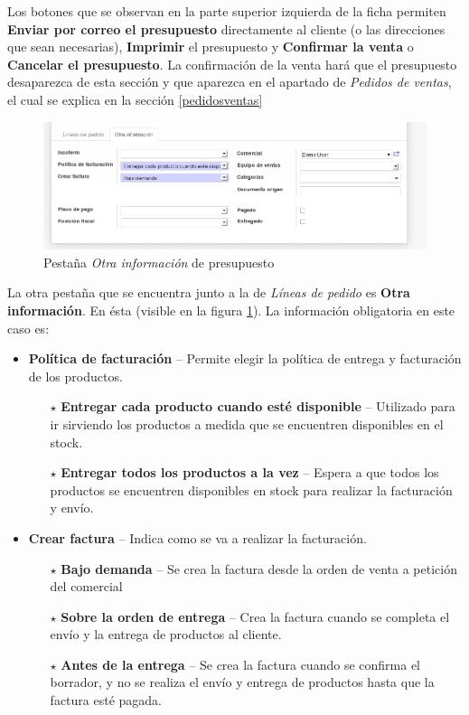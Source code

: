 Los botones que se observan en la parte superior izquierda de la ficha permiten \textbf{Enviar por correo el presupuesto} directamente al
cliente (o las direcciones que sean necesarias), \textbf{Imprimir} el presupuesto y \textbf{Confirmar la venta} o \textbf{Cancelar el presupuesto}. La confirmación de la venta hará que el presupuesto desaparezca de esta sección y que aparezca en el apartado de \emph{Pedidos de ventas}, el cual se explica en la sección \ref{pedidosventas}

\begin{figure}[H]
\includegraphics[width=\textwidth]{ventas/img/ven_preindotra.png}
\caption{Pestaña \emph{Otra información} de presupuesto}
\label{ven:preindotra}
\end{figure}

La otra pestaña que se encuentra junto a la de \emph{Líneas de pedido} es \textbf{Otra información}. En ésta (visible en la figura 
\ref{ven:preindotra}). La información obligatoria en este caso es:

\begin{itemize}
  \item \textbf{Política de facturación} -- Permite elegir la política de entrega y facturación de los productos.
  \begin{itemize}
    \item[$\star$] \textbf{Entregar cada producto cuando esté disponible} -- Utilizado para ir sirviendo los productos a medida que se encuentren 
          disponibles en el stock.
    \item[$\star$] \textbf{Entregar todos los productos a la vez} -- Espera a que todos los productos se encuentren disponibles en stock para realizar la
          facturación y envío.
  \end{itemize}

  \item \textbf{Crear factura} -- Indica como se va a realizar la facturación.
    \begin{itemize}
      \item[$\star$] \textbf{Bajo demanda} -- Se crea la factura desde la orden de venta a petición del comercial
      \item[$\star$] \textbf{Sobre la orden de entrega} -- Crea la factura cuando se completa el envío y la entrega de productos al cliente.
      \item[$\star$] \textbf{Antes de la entrega} -- Se crea la factura cuando se confirma el borrador, y no se realiza el envío y entrega de productos hasta
           que la factura esté pagada.
    \end{itemize}
\end{itemize}


